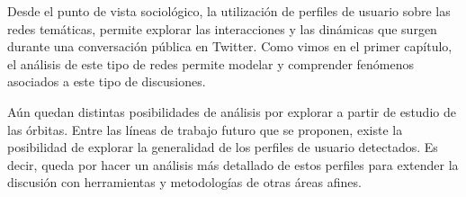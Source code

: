 Desde el punto de vista sociológico, la utilización de perfiles de usuario sobre las redes temáticas, permite explorar las interacciones y las dinámicas que surgen durante una conversación pública en Twitter. Como vimos en el primer capítulo, el análisis de este tipo de redes permite modelar y comprender fenómenos asociados a este tipo de discusiones. 

Aún quedan distintas posibilidades de análisis por explorar a partir de estudio de las órbitas. Entre las líneas de trabajo futuro que se proponen, existe la posibilidad de explorar la generalidad de los perfiles de usuario detectados. Es decir, queda por hacer un análisis más detallado de estos perfiles para extender la discusión con herramientas y metodologías de otras áreas afines.

